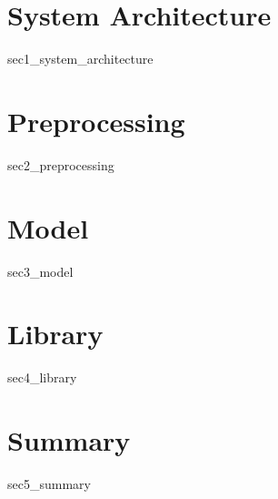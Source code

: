 \section{System Architecture}
{sec1_system_architecture}

\section{Preprocessing}
{sec2_preprocessing}

\section{Model}
{sec3_model}

\section{Library}
{sec4_library}

\section{Summary}
{sec5_summary}
